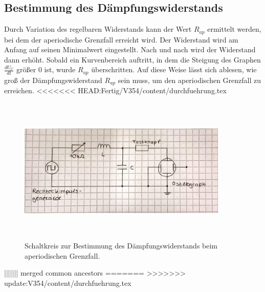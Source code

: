 \subsection{Bestimmung des Dämpfungswiderstands}
Durch Variation des regelbaren Widerstands kann der Wert $R_{ap}$ ermittelt werden, bei dem der aperiodische
Grenzfall erreicht wird.
Der Widerstand wird am Anfang auf seinen Minimalwert eingestellt. Nach und nach wird der Widerstand dann erhöht. 
Sobald ein Kurvenbereich auftritt, in dem die Steigung des Graphen $\frac{dU_{C}}{dt}$ größer 0 ist, wurde 
$R_{ap}$ überschritten. Auf diese Weise lässt sich ablesen, wie groß der Dämpfungswiderstand $R_{ap}$
sein muss, um den aperiodischen Grenzfall zu erreichen.
<<<<<<< HEAD:Fertig/V354/content/durchfuehrung.tex
\begin{figure}
    \centering
    \includegraphics[width= 10cm, height= 7cm]{build/b.jpg}
    \caption{Schaltkreis zur Bestimmung des Dämpfungswiderstands beim aperiodischen Grenzfall.}
    \label{fig:b}
\end{figure}
||||||| merged common ancestors
=======
>>>>>>> update:V354/content/durchfuehrung.tex

